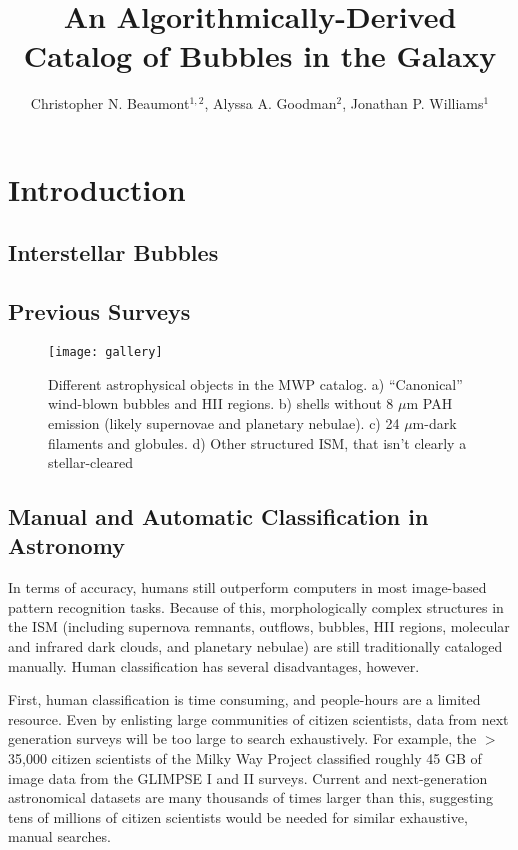 \documentclass[preprint]{aastex}
\begin{document}
\title{An Algorithmically-Derived Catalog of Bubbles in the Galaxy}
\author{Christopher N. Beaumont$^{1,2}$, Alyssa A. Goodman$^2$, Jonathan P. Williams$^1$}

\section{Introduction}
\label{sec:intro}

\subsection{Interstellar Bubbles}
\label{sec:bubbles}

\subsection{Previous Surveys}
\label{sec:bubbles}

\begin{figure*}
\texttt{[image: gallery]}
\caption{Different astrophysical objects in the MWP catalog. a) ``Canonical'' wind-blown bubbles and HII regions. b) shells
without 8 $\mu$m PAH emission (likely supernovae and planetary nebulae). c) 24 $\mu$m-dark filaments and globules. d) Other structured
ISM, that isn't clearly a stellar-cleared}
\label{fig:gallery}
\end{figure*}

\subsection{Manual and Automatic Classification in Astronomy}
\label{sec:benefits}

In terms of accuracy, humans still outperform computers in most image-based pattern recognition tasks. Because of this, morphologically complex
structures in the ISM (including supernova remnants, outflows, bubbles, HII regions, molecular and infrared dark clouds, and planetary nebulae) are still
traditionally cataloged manually. Human classification has several disadvantages, however.

First, human classification is time consuming, and people-hours are a limited resource. Even by enlisting large communities of citizen scientists, data from next generation surveys will be too large to search exhaustively. For example, the $>$ 35,000 citizen scientists of the Milky Way Project classified roughly 45 GB of image data from the GLIMPSE I and II surveys. Current and next-generation astronomical datasets are many thousands of times larger than this, suggesting tens of millions of citizen scientists would be needed for similar exhaustive, manual searches.
\end{document}
